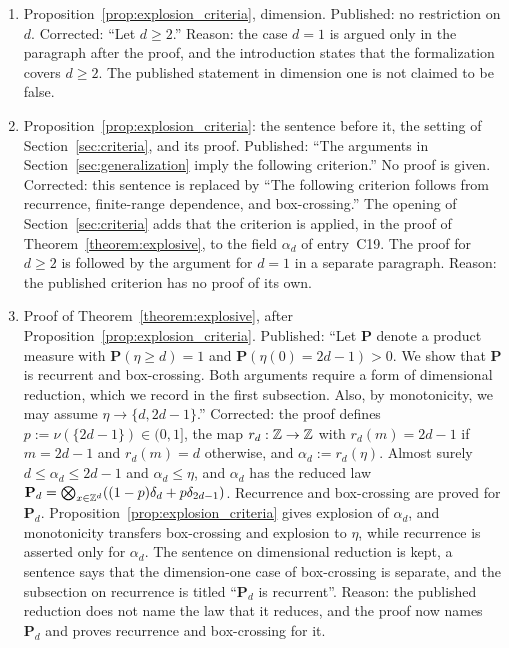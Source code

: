 \documentclass[12pt]{amsart}
\begin{document}
\begin{enumerate}
\item[C17.] Proposition~\ref{prop:explosion_criteria}, dimension. Published: no restriction on $d$. Corrected: ``Let $d\geq2$.'' Reason: the case $d=1$ is argued only in the paragraph after the proof, and the introduction states that the formalization covers $d\geq2$. The published statement in dimension one is not claimed to be false.
\item[C18.] Proposition~\ref{prop:explosion_criteria}: the sentence before it, the setting of Section~\ref{sec:criteria}, and its proof. Published: ``The arguments in Section~\ref{sec:generalization} imply the following criterion.'' No proof is given. Corrected: this sentence is replaced by ``The following criterion follows from recurrence, finite-range dependence, and box-crossing.'' The opening of Section~\ref{sec:criteria} adds that the criterion is applied, in the proof of Theorem~\ref{theorem:explosive}, to the field $\alpha_d$ of entry~C19. The proof for $d\geq2$ is followed by the argument for $d=1$ in a separate paragraph. Reason: the published criterion has no proof of its own.
\item[C19.] Proof of Theorem~\ref{theorem:explosive}, after Proposition~\ref{prop:explosion_criteria}. Published: ``Let $\mathbf P$ denote a product measure with $\mathbf P(\eta\geq d)=1$ and $\mathbf P(\eta(0)=2d-1)>0$. We show that $\mathbf P$ is recurrent and box-crossing. Both arguments require a form of dimensional reduction, which we record in the first subsection. Also, by monotonicity, we may assume $\eta\to\{d,2d-1\}$.'' Corrected: the proof defines $p:=\nu(\{2d-1\})\in(0,1]$, the map $r_d:\mathbb{Z}\to\mathbb{Z}$ with $r_d(m)=2d-1$ if $m=2d-1$ and $r_d(m)=d$ otherwise, and $\alpha_d:=r_d(\eta)$. Almost surely $d\leq\alpha_d\leq2d-1$ and $\alpha_d\leq\eta$, and $\alpha_d$ has the reduced law $\mathbf P_d=\bigotimes_{x\in\mathbb{Z}^d}((1-p)\delta_d+p\delta_{2d-1})$. Recurrence and box-crossing are proved for $\mathbf P_d$. Proposition~\ref{prop:explosion_criteria} gives explosion of $\alpha_d$, and monotonicity transfers box-crossing and explosion to $\eta$, while recurrence is asserted only for $\alpha_d$. The sentence on dimensional reduction is kept, a sentence says that the dimension-one case of box-crossing is separate, and the subsection on recurrence is titled ``$\mathbf P_d$ is recurrent''. Reason: the published reduction does not name the law that it reduces, and the proof now names $\mathbf P_d$ and proves recurrence and box-crossing for it.

\end{enumerate}
\end{document}
